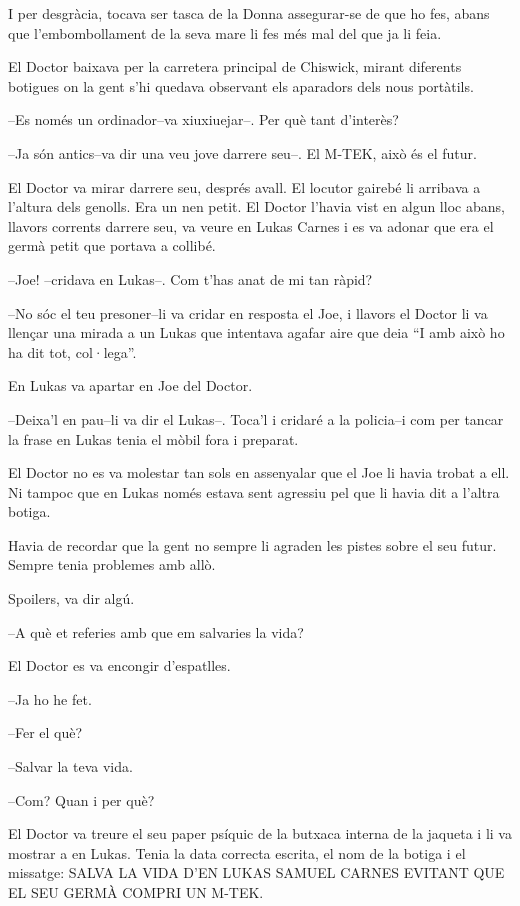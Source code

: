 I per desgràcia, tocava ser tasca de la Donna assegurar-se de que ho
fes, abans que l'embombollament de la seva mare li fes més mal del que
ja li feia.

El Doctor baixava per la carretera principal de Chiswick, mirant
diferents botigues on la gent s'hi quedava observant els aparadors dels
nous portàtils.

--Es només un ordinador--va xiuxiuejar--. Per què tant d'interès?

--Ja són antics--va dir una veu jove darrere seu--. El M-TEK, això és el
futur.

El Doctor va mirar darrere seu, després avall. El locutor gairebé li
arribava a l'altura dels genolls. Era un nen petit. El Doctor l'havia
vist en algun lloc abans, llavors corrents darrere seu, va veure en
Lukas Carnes i es va adonar que era el germà petit que portava a
collibé.

--Joe! --cridava en Lukas--. Com t'has anat de mi tan ràpid?

--No sóc el teu presoner--li va cridar en resposta el Joe, i llavors el
Doctor li va llençar una mirada a un Lukas que intentava agafar aire que
deia ``I amb això ho ha dit tot, col·lega''.

En Lukas va apartar en Joe del Doctor.

--Deixa'l en pau--li va dir el Lukas--. Toca'l i cridaré a la policia--i
com per tancar la frase en Lukas tenia el mòbil fora i preparat.

El Doctor no es va molestar tan sols en assenyalar que el Joe li havia
trobat a ell. Ni tampoc que en Lukas només estava sent agressiu pel que
li havia dit a l'altra botiga.

Havia de recordar que la gent no sempre li agraden les pistes sobre el
seu futur. Sempre tenia problemes amb allò.

Spoilers, va dir algú.

--A què et referies amb que em salvaries la vida?

El Doctor es va encongir d'espatlles.

--Ja ho he fet.

--Fer el què?

--Salvar la teva vida.

--Com? Quan i per què?

El Doctor va treure el seu paper psíquic de la butxaca interna de la
jaqueta i li va mostrar a en Lukas. Tenia la data correcta escrita, el
nom de la botiga i el missatge: SALVA LA VIDA D'EN LUKAS SAMUEL CARNES
EVITANT QUE EL SEU GERMÀ COMPRI UN M-TEK.

